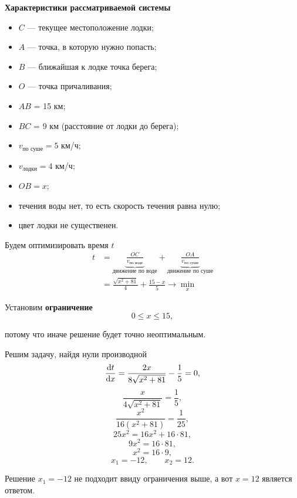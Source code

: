 \textbf{Характеристики рассматриваемой системы}
\begin{itemize}[nosep]
	\item $C$ --- текущее местоположение лодки;
	
	\item $A$ --- точка, в которую нужно попасть;
	
	\item $B$ --- ближайшая к лодке точка берега;
	
	\item $O$ --- точка причаливания;
	
	\item $AB$ = 15 км;
	
	\item $BC$ = 9 км (расстояние от лодки до берега);
	
	\item $v_{\text{по суше}} = 5$ км/ч;
	
	\item $v_{\text{лодки}} = 4$ км/ч;
	
	\item $OB = x$;
	
	\item течения воды нет, то есть скорость течения равна нулю;
	
	\item цвет лодки не существенен.
\end{itemize}

Будем оптимизировать время $t$
\begin{align*}
	t &= \underbrace{\frac{OC}{v_{\text{по воде}}}}_{\text{движение по воде}} + \underbrace{\frac{OA}{v_{\text{по суше}}}}_{\text{движение по суше}} \\
	&= \boxed{\frac{\sqrt{x^2+81}}{4} + \frac{15 - x}{5} \to \min_x}
\end{align*}

Установим \textbf{ограничение}
\[0 \le x \le 15,\]

потому что иначе решение будет точно неоптимальным.

\solution

Решим задачу, найдя нули производной
\[\derivative{t}{x} = \frac{2x}{8\sqrt{x^2+81}} - \frac{1}{5} = 0,\]
\[\frac{x}{4\sqrt{x^2+81}} = \frac{1}{5},\]
\[\frac{x^2}{16(x^2 + 81)} = \frac{1}{25},\]
\[25x^2 = 16x^2 + 16 \cdot 81,\]
\[9x^2 = 16 \cdot 81,\]
\[x^2 = 16 \cdot 9,\]
\[x_1 = -12, \qquad x_2 = 12.\]

Решение $x_1 = -12$ не подходит ввиду ограничения выше, а вот $\boxed{x = 12}$ является ответом.

